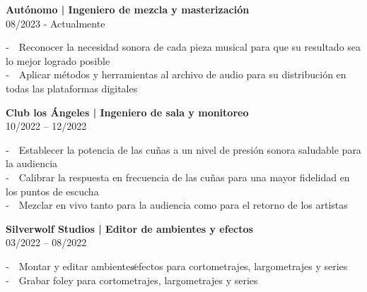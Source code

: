 
\textbf{Autónomo | Ingeniero de mezcla y masterización} \\
\textcolor{black!60}{08/2023 - Actualmente}~~ \par

-~~Reconocer la necesidad sonora de cada pieza musical para que su resultado sea lo mejor logrado posible \\ 
-~~Aplicar métodos y herramientas al archivo de audio para su distribución en todas las plataformas digitales \par

\textbf{Club los Ángeles | Ingeniero de sala y monitoreo} \\
\textcolor{black!60}{10/2022 – 12/2022}~~ \par

-~~Establecer la potencia de las cuñas a un nivel de presión sonora saludable para la audiencia \\
-~~Calibrar la respuesta en frecuencia de las cuñas para una mayor fidelidad en los puntos de escucha \\
-~~Mezclar en vivo tanto para la audiencia como para el retorno de los artistas \par

\textbf{Silverwolf Studios | Editor de ambientes y efectos} \\
\textcolor{black!60}{03/2022 – 08/2022}~~ \par

-~~Montar y editar ambientes∕efectos para cortometrajes, largometrajes y series \\
-~~Grabar foley para cortometrajes, largometrajes y series \\
